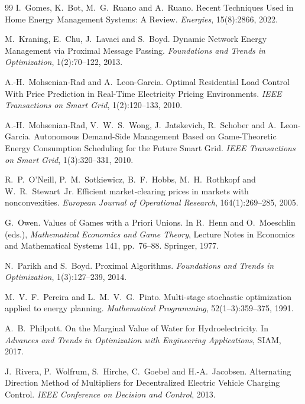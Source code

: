 \documentclass[11pt,a4paper]{article}
\begin{document}
\begin{thebibliography}{99}
I.~Gomes, K.~Bot, M.~G.~Ruano and A.~Ruano.
\newblock Recent Techniques Used in Home Energy Management Systems: A Review.
\newblock \emph{Energies}, 15(8):2866, 2022.

M.~Kraning, E.~Chu, J.~Lavaei and S.~Boyd.
\newblock Dynamic Network Energy Management via Proximal Message Passing.
\newblock \emph{Foundations and Trends in Optimization}, 1(2):70--122, 2013.

A.-H.~Mohsenian-Rad and A.~Leon-Garcia.
\newblock Optimal Residential Load Control With Price Prediction in Real-Time
Electricity Pricing Environments.
\newblock \emph{IEEE Transactions on Smart Grid}, 1(2):120--133, 2010.

A.-H.~Mohsenian-Rad, V.~W.~S.~Wong, J.~Jatskevich, R.~Schober and
A.~Leon-Garcia.
\newblock Autonomous Demand-Side Management Based on Game-Theoretic Energy
Consumption Scheduling for the Future Smart Grid.
\newblock \emph{IEEE Transactions on Smart Grid}, 1(3):320--331, 2010.

R.~P.~O'Neill, P.~M.~Sotkiewicz, B.~F.~Hobbs, M.~H.~Rothkopf and
W.~R.~Stewart~Jr.
\newblock Efficient market-clearing prices in markets with nonconvexities.
\newblock \emph{European Journal of Operational Research}, 164(1):269--285, 2005.

G.~Owen.
\newblock Values of Games with a Priori Unions.
\newblock In R.~Henn and O.~Moeschlin (eds.), \emph{Mathematical Economics and
Game Theory}, Lecture Notes in Economics and Mathematical Systems 141,
pp.~76--88. Springer, 1977.

N.~Parikh and S.~Boyd.
\newblock Proximal Algorithms.
\newblock \emph{Foundations and Trends in Optimization}, 1(3):127--239, 2014.

M.~V.~F.~Pereira and L.~M.~V.~G.~Pinto.
\newblock Multi-stage stochastic optimization applied to energy planning.
\newblock \emph{Mathematical Programming}, 52(1--3):359--375, 1991.

A.~B.~Philpott.
\newblock On the Marginal Value of Water for Hydroelectricity.
\newblock In \emph{Advances and Trends in Optimization with Engineering
Applications}, SIAM, 2017.

J.~Rivera, P.~Wolfrum, S.~Hirche, C.~Goebel and H.-A.~Jacobsen.
\newblock Alternating Direction Method of Multipliers for Decentralized
Electric Vehicle Charging Control.
\newblock \emph{IEEE Conference on Decision and Control}, 2013.


\end{thebibliography}
\end{document}
